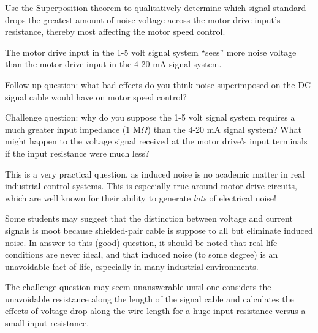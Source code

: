 Use the Superposition theorem to qualitatively determine which signal standard drops the greatest amount of noise voltage across the motor drive input's resistance, thereby most affecting the motor speed control.







The motor drive input in the 1-5 volt signal system ``sees'' more noise voltage than the motor drive input in the 4-20 mA signal system.

\vskip 10pt

Follow-up question: what bad effects do you think noise superimposed on the DC signal cable would have on motor speed control?

\vskip 10pt

Challenge question: why do you suppose the 1-5 volt signal system requires a much greater input impedance (1 M$\Omega$) than the 4-20 mA signal system?  What might happen to the voltage signal received at the motor drive's input terminals if the input resistance were much less?







This is a very practical question, as induced noise is no academic matter in real industrial control systems.  This is especially true around motor drive circuits, which are well known for their ability to generate {\it lots} of electrical noise!

Some students may suggest that the distinction between voltage and current signals is moot because shielded-pair cable is suppose to all but eliminate induced noise.  In answer to this (good) question, it should be noted that real-life conditions are never ideal, and that induced noise (to some degree) is an unavoidable fact of life, especially in many industrial environments.

The challenge question may seem unanswerable until one considers the unavoidable resistance along the length of the signal cable and calculates the effects of voltage drop along the wire length for a huge input resistance versus a small input resistance.




